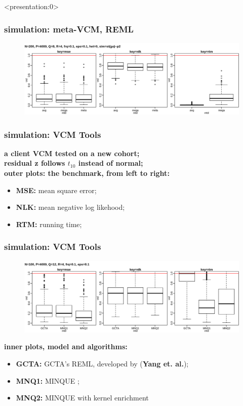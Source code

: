\documentclass{beamer}
\begin{document}
\begin{frame} <presentation:0>%
  \frametitle{simulation: meta-VCM, REML} %
  \begin{figure}
    \centering \includegraphics[width=.95\linewidth]{img/met_hom_stt_gct_ssz}
  \end{figure}
\end{frame}
\begin{frame}\frametitle{simulation: VCM Tools}
  \textbf{a client VCM tested on a new cohort;} \\
  \textbf{residual z follows $t_{10}$ instead of normal;} \\
  {\color{blue}\textbf{outer plots: the benchmark, from left to right:}}
  \begin{itemize}
  \item \textbf{MSE:} mean square error;
  \item \textbf{NLK:} mean negative log likehood;
  \item \textbf{RTM:} running time;
  \end{itemize}
\end{frame}
\begin{frame} \frametitle{simulation: VCM Tools}
  \begin{figure}
    \centering \includegraphics[width=.95\linewidth]{img/vcm_bmk_gau}
  \end{figure}
  {\color{blue}\textbf{inner plots, model and algorithms:}}
  \begin{itemize}
  \item \textbf{GCTA:} GCTA's REML, developed by (\textbf{Yang et. al.});
  \item \textbf{MNQ1:} MINQUE ;
  \item \textbf{MNQ2:} MINQUE with kernel enrichment
  \end{itemize}
\end{frame}
\end{document}
